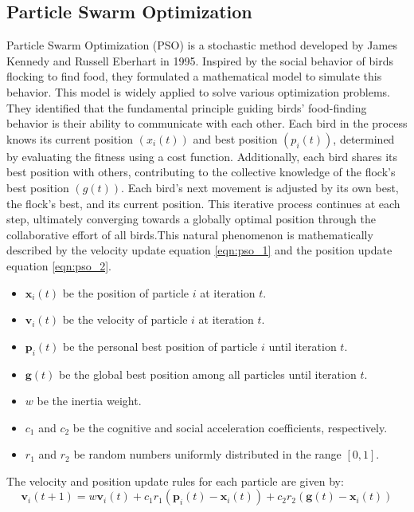 \documentclass[paper,revised]{geophysics}
\begin{document}
\subsection{Particle Swarm Optimization}
Particle Swarm Optimization (PSO) is a stochastic method developed by James Kennedy and Russell Eberhart in 1995. Inspired by the social behavior of birds flocking to find food, they formulated a mathematical model to simulate this behavior. This model is widely applied to solve various optimization problems. They identified that the fundamental principle guiding birds' food-finding behavior is their ability to communicate with each other. Each bird in the process knows its current position \((x_i(t))\) and best position \((p_i(t))\), determined by evaluating the fitness using a cost function. Additionally, each bird shares its best position with others, contributing to the collective knowledge of the flock's best position \((g(t))\). Each bird's next movement is adjusted by its own best, the flock's best, and its current position. This iterative process continues at each step, ultimately converging towards a globally optimal position through the collaborative effort of all birds.This natural phenomenon is mathematically described by the velocity update equation \ref{eqn:pso_1} and the position update equation \ref{eqn:pso_2}.
\begin{itemize}
	\item \( \mathbf{x}_i(t) \) be the position of particle \( i \) at iteration \( t \).
	\item \( \mathbf{v}_i(t) \) be the velocity of particle \( i \) at iteration \( t \).
	\item \( \mathbf{p}_i(t) \) be the personal best position of particle \( i \) until iteration \( t \).
	\item \( \mathbf{g}(t) \) be the global best position among all particles until iteration \( t \).
	\item \( w \) be the inertia weight.
	\item \( c_1 \) and \( c_2 \) be the cognitive and social acceleration coefficients, respectively.
	\item \( r_1 \) and \( r_2 \) be random numbers uniformly distributed in the range \([0, 1]\).
\end{itemize}

The velocity and position update rules for each particle are given by:
\begin{equation}	
	\mathbf{v}_i(t+1) = w \mathbf{v}_i(t) + c_1 r_1 (\mathbf{p}_i(t) - \mathbf{x}_i(t)) + c_2 r_2 (\mathbf{g}(t) - \mathbf{x}_i(t))	
	\label{eqn:pso_1}
\end{equation}
\end{document}

